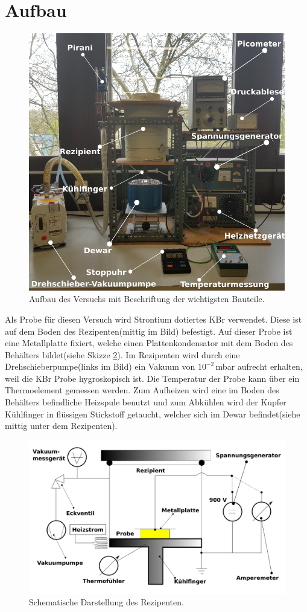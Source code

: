 \section{Aufbau}
\label{Aufbau}
\begin{figure}
    \centering
    \includegraphics[width=0.5\linewidth]{data/Aufbau.png}
    \caption{Aufbau des Versuchs mit Beschriftung der wichtigsten Bauteile.}
    \label{fig:aufbau}
\end{figure}
Als Probe für diesen Versuch wird Strontium dotiertes KBr verwendet.
Diese ist auf dem Boden des Rezipenten(mittig im Bild) befestigt.
Auf dieser Probe ist eine Metallplatte fixiert, welche einen Plattenkondensator mit dem Boden des Behälters bildet(siehe Skizze \ref{fig:skizze}).
Im Rezipenten wird durch eine Drehschieberpumpe(links im Bild) ein Vakuum von $10^{-2}\,$mbar aufrecht erhalten, weil die KBr Probe hygroskopisch ist.
Die Temperatur der Probe kann über ein Thermoelement gemessen werden.
Zum Aufheizen wird eine im Boden des Behälters befindliche Heizspule benutzt und zum Abkühlen wird der Kupfer Kühlfinger in flüssigen Stickstoff getaucht, welcher sich im Dewar befindet(siehe mittig unter dem Rezipenten).
\begin{figure}
    \centering
    \includegraphics[width=0.5\linewidth]{data/Skizze.png}
    \caption{Schematische Darstellung des Rezipenten.}
    \label{fig:skizze}
\end{figure}

